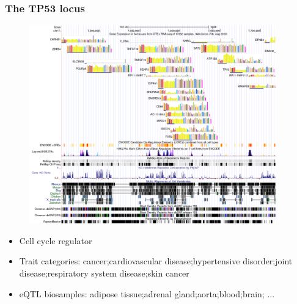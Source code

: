 \documentclass{beamer}
\begin{document}
    \begin{frame}
        \frametitle{The TP53 locus}

        \begin{figure}[!]
            \includegraphics[width=0.95\textwidth]{fig/tp53}
        \end{figure}

        \begin{itemize}
            \item Cell cycle regulator
            \item Trait categories: cancer;cardiovascular disease;hypertensive disorder;joint disease;respiratory system disease;skin cancer
            \item eQTL biosamples: adipose tissue;adrenal gland;aorta;blood;brain; ...
        \end{itemize}

    \end{frame}

%
%
%
%
\end{document}
